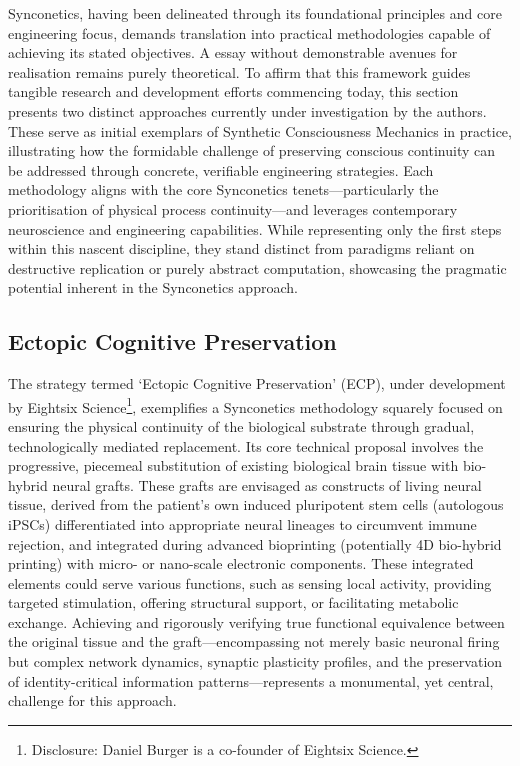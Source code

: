 \documentclass[10pt]{article}
\begin{document}
\begin{sloppypar}
  Synconetics, having been delineated through its foundational principles and core engineering focus, demands translation into practical methodologies capable of achieving its stated objectives. A essay without demonstrable avenues for realisation remains purely theoretical. To affirm that this framework guides tangible research and development efforts commencing today, this section presents two distinct approaches currently under investigation by the authors. These serve as initial exemplars of Synthetic Consciousness Mechanics in practice, illustrating how the formidable challenge of preserving conscious continuity can be addressed through concrete, verifiable engineering strategies. Each methodology aligns with the core Synconetics tenets—particularly the prioritisation of physical process continuity—and leverages contemporary neuroscience and engineering capabilities. While representing only the first steps within this nascent discipline, they stand distinct from paradigms reliant on destructive replication or purely abstract computation, showcasing the pragmatic potential inherent in the Synconetics approach.

  \subsection{Ectopic Cognitive Preservation}
  \label{sec:daniel-approach}

  The strategy termed ‘Ectopic Cognitive Preservation’ (ECP), under development by Eightsix Science\footnote{Disclosure: Daniel Burger is a co-founder of Eightsix Science.}, exemplifies a Synconetics methodology squarely focused on ensuring the physical continuity of the biological substrate through gradual, technologically mediated replacement. Its core technical proposal involves the progressive, piecemeal substitution of existing biological brain tissue with bio-hybrid neural grafts. These grafts are envisaged as constructs of living neural tissue, derived from the patient’s own induced pluripotent stem cells (autologous iPSCs) differentiated into appropriate neural lineages to circumvent immune rejection, and integrated during advanced bioprinting (potentially 4D bio-hybrid printing) with micro- or nano-scale electronic components. These integrated elements could serve various functions, such as sensing local activity, providing targeted stimulation, offering structural support, or facilitating metabolic exchange. Achieving and rigorously verifying true functional equivalence between the original tissue and the graft—encompassing not merely basic neuronal firing but complex network dynamics, synaptic plasticity profiles, and the preservation of identity-critical information patterns—represents a monumental, yet central, challenge for this approach.


\end{sloppypar}
\end{document}
